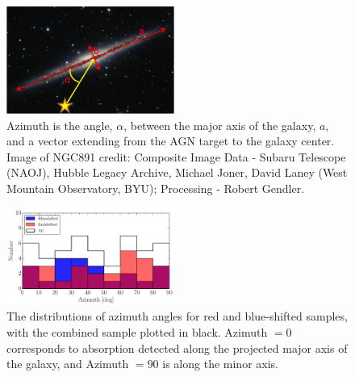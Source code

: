 \documentclass[twocolumn,tighten]{aastex6}
\begin{document}
\begin{figure}[ht!]
        \centering
        \includegraphics[width=0.49\textwidth]{azimuth_illustration2.png}
        \caption{\small{Azimuth is the angle, $\alpha$, between the major axis of the galaxy, $a$, and a vector extending from the AGN target to the galaxy center. Image of NGC891 credit: Composite Image Data - Subaru Telescope (NAOJ), Hubble Legacy Archive, Michael Joner, David Laney (West Mountain Observatory, BYU); Processing - Robert Gendler.}}
        \label{azimuth_illustration}
        \vspace{5pt}
\end{figure} 

\begin{figure}[ht!]
        \centering
        \includegraphics[width=0.49\textwidth]{hist(azimuth)_overlaid_all.pdf}
        \caption{\small{The distributions of azimuth angles for red and blue-shifted samples, with the combined sample plotted in black. Azimuth $= 0$ corresponds to absorption detected along the projected major axis of the galaxy, and Azimuth $= 90$ is along the minor axis.}}
        \label{azimuth_dist}
        \vspace{5pt}
\end{figure}
\end{document}
